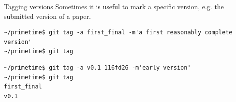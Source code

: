 \documentclass[svgnames]{beamer}
\begin{document}
\begin{frame}[fragile]{Tagging versions}
 Sometimes it is useful to mark a specific version, e.g. the submitted version of a paper.

 \begin{lstlisting}
~/primetime$ git tag -a first_final -m'a first reasonably complete version'
~/primetime$ git tag
 \end{lstlisting}

 \begin{lstlisting}
~/primetime$ git tag -a v0.1 116fd26 -m'early version'
~/primetime$ git tag
first_final
v0.1
 \end{lstlisting}
\end{frame}
\end{document}
